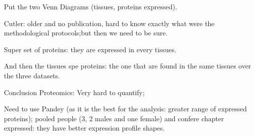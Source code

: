 Put the two Venn Diagrams (tissues, proteins expressed).

Cutler: older and no publication,
hard to know exactly what were the methodological protocols;but then we need to
be sure.

Super set of proteins: they are expressed in every tissues.

And then the tissues spe proteins: the one that are found in the same tissues
over the three datasets.



Conclusion Proteomics: Very hard to quantify;

Need to use Pandey (as it is the best for the analysis:
greater range of expressed proteins); pooled people (3, 2 males and one female)
and confere chapter expressed: they have better expression profile shapes.




